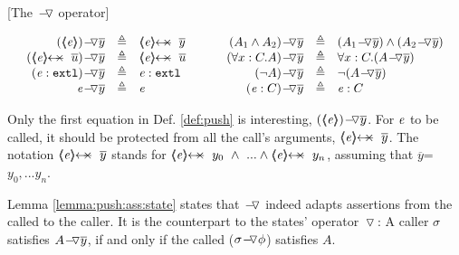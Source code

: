 \begin{definition}
\label{def:push}
[The $\FIXSymbolA$  operator]  

$
\begin{array}{c}
\begin{array}{l}
\begin{array}{rclcrcl}
  \PushAS y {(\inside \re)} & \triangleq &  \protectedFrom \re {\overline {y} }
  & \ \ \  \ &
  \PushAS y   {(A_1  \wedge  A_2)} & \triangleq &  (\PushAS y  { A_1})  \wedge  ( \PushAS y  {A_2} )  
\\ 
 \PushAS y {(\protectedFrom \re {\overline {u}})} &  \triangleq& \protectedFrom \re {\overline {u}} 
  & &
 \PushAS y  {(\forall x:C.A)} & \triangleq & \forall x:C.({\PushAS y A} )  
  \\  
  \PushAS y  {(\external \re)} &  \triangleq & {\external \re}  %
  & & 
  \PushAS y  {(\neg A)} &  \triangleq & \neg( {\PushAS y A} )  
    \\
     \PushAS y  {\re} &  \triangleq&   \re %
    & &
    \PushAS y  {(\re:C)} &  \triangleq&   \re:C 
 \end{array}
\end{array}
\end{array}
$
\label{f:Push}
\end{definition}

Only the first equation in  Def.  \ref{def:push}  is interesting,
  $\PushAS y {(\inside \re)}$.  
For $\re$ to be  called, it should be protected from all the call's arguments,
\ie  $\protectedFrom {\re} {\overline {y}}$. 
The notation $\protectedFrom {\re} {\overline {y}}$   stands for $\protectedFrom \re {y_0}\  \wedge\  ...  \wedge \protectedFrom \re {y_n}$, assuming that $\overline y$=${y_0, ... y_n}$.

Lemma \ref{lemma:push:ass:state}  states that  $\FIXSymbolA$ indeed adapts assertions from the called to the caller.
It is the counterpart to the states' operator $\pushSymbol$:
A caller   $\sigma$ satisfies  $\PushAS y A$, if and only if the called   ($\PushASLong {\phi} {\sigma}$) %
satisfies $A$.  

